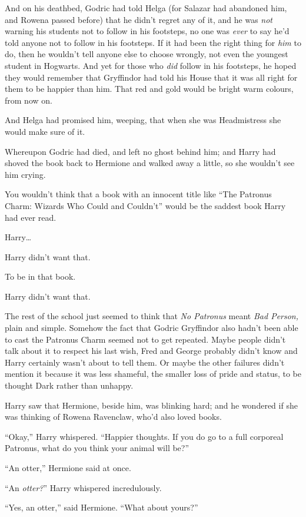 And on his deathbed, Godric had told Helga (for Salazar had abandoned him, and Rowena passed before) that he didn’t regret any of it, and he was \emph{not} warning his students not to follow in his footsteps, no one was \emph{ever} to say he’d told anyone not to follow in his footsteps. If it had been the right thing for \emph{him} to do, then he wouldn’t tell anyone else to choose wrongly, not even the youngest student in Hogwarts. And yet for those who \emph{did} follow in his footsteps, he hoped they would remember that Gryffindor had told his House that it was all right for them to be happier than him. That red and gold would be bright warm colours, from now on.

And Helga had promised him, weeping, that when she was Headmistress she would make sure of it.

Whereupon Godric had died, and left no ghost behind him; and Harry had shoved the book back to Hermione and walked away a little, so she wouldn’t see him crying.

You wouldn’t think that a book with an innocent title like “The Patronus Charm: Wizards Who Could and Couldn’t” would be the saddest book Harry had ever read.

Harry…

Harry didn’t want that.

To be in that book.

Harry didn’t want that.

The rest of the school just seemed to think that \emph{No Patronus} meant \emph{Bad Person,} plain and simple. Somehow the fact that Godric Gryffindor also hadn’t been able to cast the Patronus Charm seemed not to get repeated. Maybe people didn’t talk about it to respect his last wish, Fred and George probably didn’t know and Harry certainly wasn’t about to tell them. Or maybe the other failures didn’t mention it because it was less shameful, the smaller loss of pride and status, to be thought Dark rather than unhappy.

Harry saw that Hermione, beside him, was blinking hard; and he wondered if she was thinking of Rowena Ravenclaw, who’d also loved books.

“Okay,” Harry whispered. “Happier thoughts. If you do go to a full corporeal Patronus, what do you think your animal will be?”

“An otter,” Hermione said at once.

“An \emph{otter?}” Harry whispered incredulously.

“Yes, an otter,” said Hermione. “What about yours?”

